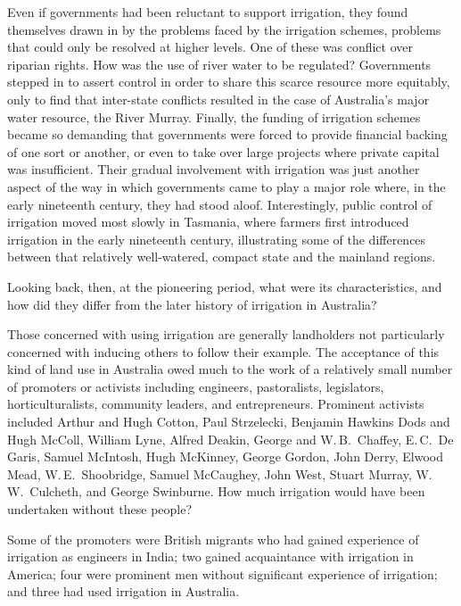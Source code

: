 Even if governments had been reluctant to support irrigation, they
found themselves drawn in by the problems faced by the irrigation
schemes, problems that could only be resolved at higher levels. One of
these was conflict over riparian rights.  How
was the use of river water to be regulated? Governments stepped in to
assert control in order to share this scarce resource more equitably,
only to find that inter-state conflicts resulted in the case of
Australia's major water resource, the River Murray. Finally, the
funding of irrigation schemes became so demanding that governments
were forced to provide financial backing of one sort or another, or
even to take over large projects where private capital was
insufficient. Their gradual involvement with irrigation was just
another aspect of the way in which governments came to play a major
role where, in the early nineteenth century, they had stood
aloof. Interestingly, public control of irrigation moved most slowly
in Tasmania,  where farmers first introduced
irrigation in the early nineteenth century, illustrating some of the
differences between that relatively well-watered, compact state and
the mainland regions.

Looking back, then, at the pioneering period, what were its
characteristics, and how did they differ from the later history of
irrigation in Australia?

\bigskip\noindent
Those concerned with using irrigation are generally landholders not
particularly concerned with inducing others to follow their
example. The acceptance of this kind of land use in Australia owed
much to the work of a relatively small number of promoters or
activists including engineers, pastoralists, legislators,
horticulturalists, community leaders, and entrepreneurs.  Prominent
activists included Arthur and Hugh Cotton, Paul Strzelecki, Benjamin
Hawkins Dods and Hugh McColl, William Lyne, Alfred Deakin, George and
W.\,B.~Chaffey, E.\,C.~De Garis, Samuel McIntosh, Hugh McKinney,
George Gordon, John Derry, Elwood Mead, W.\,E.~Shoobridge, Samuel
McCaughey, John West, Stuart Murray, W.\,W.~Culcheth, and George
Swinburne. How much irrigation would have been undertaken without
these people?

Some of the promoters were British migrants who had gained experience
of irrigation as engineers in India; two gained acquaintance with
irrigation in America; four were prominent men without significant
experience of irrigation; and three had used irrigation in Australia.


